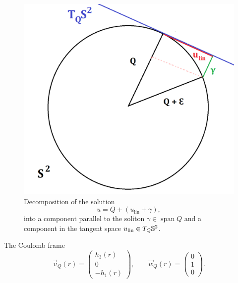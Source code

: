 \begin{figure}[h]
    \begin{center}
        \includegraphics[scale = 0.3]{graphics/coulombQ}
        \caption{Decomposition of the solution 
            \[u = Q + (u_{\mathrm{lin}} + \gamma),\] 
        into a component parallel to the soliton $\gamma \in \operatorname{span} Q$ and a component in the tangent space $u_{\mathrm{lin}} \in T_Q \mathbb S^2$. }
    \end{center}
\end{figure}

The Coulomb frame 
    \[
        \vec v_Q (r) 
            = \begin{pmatrix} h_3 (r) \\ 0 \\ - h_1 (r) \end{pmatrix},
        \qquad
        \vec w_Q (r) 
            = \begin{pmatrix} 0 \\ 1 \\ 0 \end{pmatrix}. 
    \]